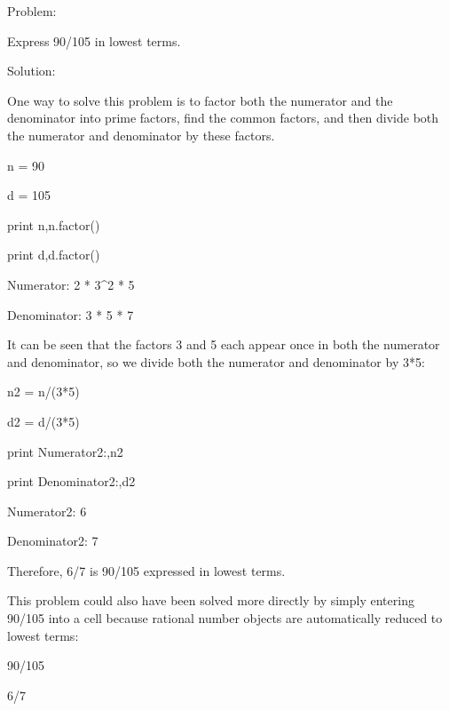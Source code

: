 \documentclass[12pt,twoside]{book}
\begin{document}
{\textquotedbl}{\textquotedbl}{\textquotedbl}

Problem:

Express 90/105 in lowest terms.


\bigskip

Solution:

One way to solve this problem is to factor both the numerator and the denominator into prime factors, find the common factors, and then divide both the numerator and denominator by these factors.

{\textquotedbl}{\textquotedbl}{\textquotedbl}

n = 90

d = 105

print n,n.factor()

print d,d.factor()

{\textbar}

Numerator: 2 * 3\^{}2 * 5

Denominator: 3 * 5 * 7


\bigskip

{\textquotedbl}{\textquotedbl}{\textquotedbl}

It can be seen that the factors 3 and 5 each appear once in both the numerator and denominator, so we divide both the numerator and denominator by 3*5:

{\textquotedbl}{\textquotedbl}{\textquotedbl}

n2 = n/(3*5)

d2 = d/(3*5)

print {\textquotedbl}Numerator2:{\textquotedbl},n2

print {\textquotedbl}Denominator2:{\textquotedbl},d2

{\textbar}

Numerator2: 6

Denominator2: 7


\bigskip

{\textquotedbl}{\textquotedbl}{\textquotedbl}

Therefore, 6/7 is 90/105 expressed in lowest terms.


\bigskip

This problem could also have been solved more directly by simply entering 90/105 into a cell because rational number objects are automatically reduced to lowest terms:

{\textquotedbl}{\textquotedbl}{\textquotedbl}

90/105

{\textbar}

6/7
\end{document}
